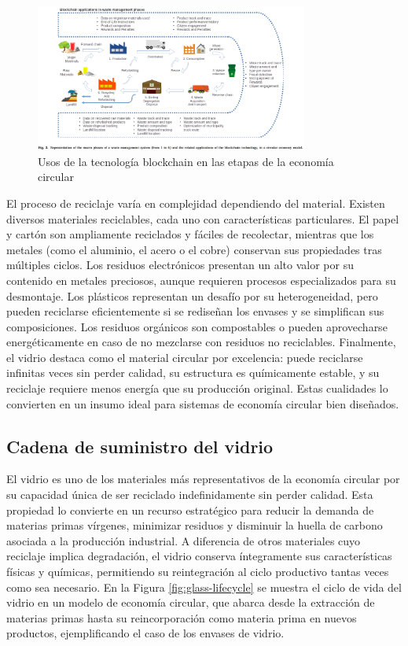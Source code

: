 \begin{figure}[!tb]
    \centering
    \includegraphics[width=0.8\textwidth]{Figures/baralla-model-1.png}
    \caption{Usos de la tecnología blockchain en las etapas de la economía circular \cite{baralla2023waste}}
    \label{fig:baralla-model-1}
\end{figure}

El proceso de reciclaje varía en complejidad dependiendo del material. Existen diversos materiales reciclables, cada uno con características particulares. El papel y cartón son ampliamente reciclados y fáciles de recolectar, mientras que los metales (como el aluminio, el acero o el cobre) conservan sus propiedades tras múltiples ciclos. Los residuos electrónicos presentan un alto valor por su contenido en metales preciosos, aunque requieren procesos especializados para su desmontaje. Los plásticos representan un desafío por su heterogeneidad, pero pueden reciclarse eficientemente si se rediseñan los envases y se simplifican sus composiciones. Los residuos orgánicos son compostables o pueden aprovecharse energéticamente en caso de no mezclarse con residuos no reciclables. Finalmente, el vidrio destaca como el material circular por excelencia: puede reciclarse infinitas veces sin perder calidad, su estructura es químicamente estable, y su reciclaje requiere menos energía que su producción original. Estas cualidades lo convierten en un insumo ideal para sistemas de economía circular bien diseñados.

\subsection{Cadena de suministro del vidrio}
\label{sec:glass-supply-chain}

El vidrio es uno de los materiales más representativos de la economía circular por su capacidad única de ser reciclado indefinidamente sin perder calidad. Esta propiedad lo convierte en un recurso estratégico para reducir la demanda de materias primas vírgenes, minimizar residuos y disminuir la huella de carbono asociada a la producción industrial. A diferencia de otros materiales cuyo reciclaje implica degradación, el vidrio conserva íntegramente sus características físicas y químicas, permitiendo su reintegración al ciclo productivo tantas veces como sea necesario. En la Figura \ref{fig:glass-lifecycle} se muestra el ciclo de vida del vidrio en un modelo de economía circular, que abarca desde la extracción de materias primas hasta su reincorporación como materia prima en nuevos productos, ejemplificando el caso de los envases de vidrio.

